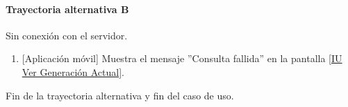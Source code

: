 \paragraph{Trayectoria alternativa B} \label{SUB-U-CU1.2:TB}
	Sin conexión con el servidor.
	\begin{enumerate}[label=B\arabic*.]
		\item {[Aplicación móvil]} Muestra el mensaje ''Consulta fallida'' en la pantalla \hyperref[fig:monitoreoReal]{[IU Ver Generación Actual]}.
	\end{enumerate}
	Fin de la trayectoria alternativa y fin del caso de uso.


